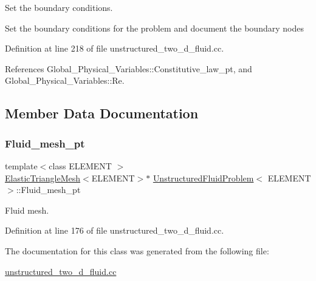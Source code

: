 Set the boundary conditions. 

Set the boundary conditions for the problem and document the boundary nodes 

Definition at line 218 of file unstructured\+\_\+two\+\_\+d\+\_\+fluid.\+cc.



References Global\+\_\+\+Physical\+\_\+\+Variables\+::\+Constitutive\+\_\+law\+\_\+pt, and Global\+\_\+\+Physical\+\_\+\+Variables\+::\+Re.



\subsection{Member Data Documentation}
\mbox{\label{classUnstructuredFluidProblem_a9b653c3879c846b412068d03bfe8c202}} 
\subsubsection{\texorpdfstring{Fluid\+\_\+mesh\+\_\+pt}{Fluid\_mesh\_pt}}
{\footnotesize\ttfamily template$<$class E\+L\+E\+M\+E\+NT $>$ \\
\hyperlink{classElasticTriangleMesh}{Elastic\+Triangle\+Mesh}$<$E\+L\+E\+M\+E\+NT$>$$\ast$ \hyperlink{classUnstructuredFluidProblem}{Unstructured\+Fluid\+Problem}$<$ E\+L\+E\+M\+E\+NT $>$\+::Fluid\+\_\+mesh\+\_\+pt\hspace{0.3cm}{\ttfamily [private]}}



Fluid mesh. 



Definition at line 176 of file unstructured\+\_\+two\+\_\+d\+\_\+fluid.\+cc.



The documentation for this class was generated from the following file\+:\begin{DoxyCompactItemize}
\item 
\hyperlink{unstructured__two__d__fluid_8cc}{unstructured\+\_\+two\+\_\+d\+\_\+fluid.\+cc}\end{DoxyCompactItemize}
